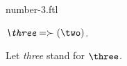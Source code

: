 \documentclass{stex}
\begin{document}
\begin{smodule}{number-3.ftl}



\begin{definition}[forthel,id=ThreeDef]
  $\emph{\three} = \succ(\two)$.

  Let \emph{three} stand for $\three$.
\end{definition}

\end{smodule}
\end{document}
